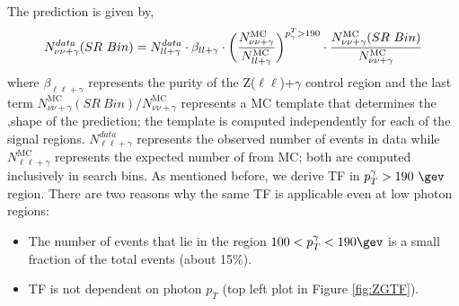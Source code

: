 The prediction is given by,
\begin{equation}
\label{eq:zgamma}
  \centering
  N_{\nu\nu+\gamma}^{data}(SR\ Bin) = N_{ll+\gamma}^{data}\cdot \beta_{ll+\gamma}\cdot  \bigg( \frac{N^{\text{MC}}_{\nu\nu+\gamma}}{N_{ll+\gamma}^{\text{MC}}} \bigg)^{p^T_\gamma > 190}\cdot \frac{N^{\text{MC}}_{\nu\nu+\gamma}(SR\ Bin)}{N^{\text{MC}}_{\nu\nu+\gamma}}
\end{equation}
where $\beta_{\ell\ell+\gamma}$ represents the purity of the Z($\ell\ell$)+$\gamma$ control
region and the last term $N_{\nu\nu+\gamma}^{\text{MC}}(SR\ Bin)/N^{\text{MC}}_{\nu\nu+\gamma}$ 
represents a MC template that determines the 
\ptmiss,\nj shape of the prediction; the template is computed independently for each 
of the signal regions. $N_{\ell\ell+\gamma}^{data}$ represents the
observed number of events in data while $N_{\ell\ell+\gamma}^{\text{MC}}$ represents 
the expected number of from MC; both are computed inclusively in search bins. 
As mentioned before, we derive TF in $p_T^{\gamma} > 190\ \gev$ region. There are two reasons why the same TF is applicable even at low photon \ptg regions:\\

\begin{itemize}
\item The number of events that lie in the region $100 < p_T^{\gamma} < 190\gev$ is a small fraction of the total events (about 15\%).
\item TF is not dependent on photon $p_T$ (top left plot in Figure \ref{fig:ZGTF}).
\end{itemize}

